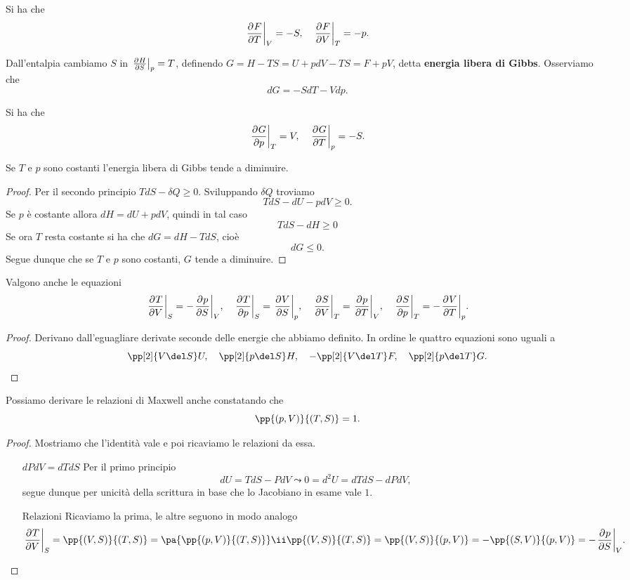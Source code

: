 \begin{remark}
Si ha che
\[\ppb TFV=-S,\quad \ppb VFT=-p.\]
\end{remark}

\begin{definition}
Dall'entalpia cambiamo $S$ in $\ppb SHp=T$, definendo $G=H-TS=U+pdV-TS=F+pV$, detta \textbf{energia libera di Gibbs}. Osserviamo che
\[dG=-SdT-Vdp.\]
\end{definition}

\begin{remark}
Si ha che
\[\ppb pGT=V,\quad \ppb TGp=-S.\]
\end{remark}

\begin{proposition}\label{GibbsDiminuiscePerPressioneETemperaturaCostanti}
Se $T$ e $p$ sono costanti l'energia libera di Gibbs tende a diminuire.
\end{proposition}
\begin{proof}
Per il secondo principio $TdS-\delta Q\geq 0$. Sviluppando $\delta Q$ troviamo
\[TdS-dU-pdV\geq0.\]
Se $p$ \`e costante allora $dH=dU+pdV$, quindi in tal caso
\[TdS-dH\geq 0\]
Se ora $T$ resta costante si ha che $dG=dH-TdS$, cio\`e
\[dG\leq 0.\]
Segue dunque che se $T$ e $p$ sono costanti, $G$ tende a diminuire.
\end{proof}


\begin{proposition}\label{RelazioniMaxwell}
Valgono anche le equazioni
\[\ppb VTS=-\ppb SpV,\quad \ppb pTS=\ppb SVp,\quad \ppb VST=\ppb TpV,\quad \ppb pST=-\ppb TVp.\]
\end{proposition}
\begin{proof}
Derivano dall'eguagliare derivate seconde delle energie che abbiamo definito. In ordine le quattro equazioni sono uguali a
\[\pp[2]{V\del S}U,\quad \pp[2]{p\del S}H,\quad -\pp[2]{V\del T}F,\quad \pp[2]{p\del T}G.\]
\end{proof}

\begin{remark}[Jacobiano $p,V$ - $T,S$]
Possiamo derivare le relazioni di Maxwell anche constatando che
\[\pp{(p,V)}{(T,S)}=1.\]
\end{remark}
\begin{proof}
Mostriamo che l'identit\`a vale e poi ricaviamo le relazioni da essa.
\setlength{\leftmargini}{0cm}
\begin{itemize}
\item[$\boxed{dPdV=dTdS}$] Per il primo principio
\[dU=TdS-PdV\leadsto 0=d^2U=dTdS-dPdV,\]
segue dunque per unicit\`a della scrittura in base che lo Jacobiano in esame vale $1$.
\item[$\boxed{\text{Relazioni}}$] Ricaviamo la prima, le altre seguono in modo analogo
\[\ppb VTS=\pp{(V,S)}{(T,S)}=\pa{\pp{(p,V)}{(T,S)}}\ii\pp{(V,S)}{(T,S)}=\pp{(V,S)}{(p,V)}=-\pp{(S,V)}{(p,V)}=-\ppb SpV.\]
\end{itemize}
\setlength{\leftmargini}{0.5cm}
\end{proof}





